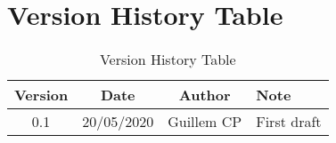 \section{Version History Table}

\begin{table}[h]
	\centering
	\begin{tabular}{|c|c|c|l|}
		\hline
		Version & Date       & Author     & Note                                \\ \hline
		0.1     & 20/05/2020 & Guillem CP & First draft                         \\ \hline
	\end{tabular}
	\caption{Version History Table}
	\label{tab:version-table}
\end{table}
